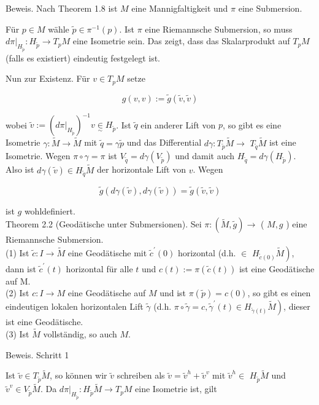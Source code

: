 \documentclass[10pt, letterpaper]{article}
\begin{document}
Beweis. Nach Theorem 1.8 ist $M$ eine Mannigfaltigkeit und $\pi$ eine Submersion.

Für $p \in M$ wähle $\tilde{p} \in \pi^{-1}(p)$. Ist $\pi$ eine Riemannsche Submersion, so muss $\left.d \pi\right|_{H_{\tilde{p}}}: H_{\tilde{p}} \rightarrow T_{p} M$ eine Isometrie sein. Das zeigt, dass das Skalarprodukt auf $T_{p} M$ (falls es existiert) eindeutig festgelegt ist.

Nun zur Existenz. Für $v \in T_{p} M$ setze

$$
g(v, v):=\tilde{g}(\tilde{v}, \tilde{v})
$$

wobei $\tilde{v}:=\left(\left.d \pi\right|_{H_{\tilde{p}}}\right)^{-1} v \underset{\sim}{\in} H_{\tilde{p}}$. Ist $\tilde{q}$ ein anderer Lift von $p$, so gibt es eine Isometrie $\gamma: \tilde{M} \rightarrow \tilde{M}$ mit $\tilde{q}=\gamma \tilde{p}$ und das Differential $d \gamma: T_{\tilde{p}} \tilde{M} \rightarrow$ $T_{\tilde{q}} \tilde{M}$ ist eine Isometrie. Wegen $\pi \circ \gamma=\pi$ ist $V_{\tilde{q}}=d \gamma\left(V_{\tilde{p}}\right)$ und damit auch $H_{\tilde{q}}=d \gamma\left(H_{\tilde{p}}\right)$. Also ist $d \gamma(\tilde{v}) \in H_{\tilde{q}} \tilde{M}$ der horizontale Lift von $v$. Wegen

$$
\tilde{g}(d \gamma(\tilde{v}), d \gamma(\tilde{v}))=\tilde{g}(\tilde{v}, \tilde{v})
$$

ist $g$ wohldefiniert.\\
Theorem 2.2 (Geodätische unter Submersionen). Sei $\pi:(\tilde{M}, \tilde{g}) \rightarrow$ ( $M, g$ ) eine Riemannsche Submersion.\\
(1) Ist $\tilde{c}: I \rightarrow \tilde{M}$ eine Geodätische mit $\tilde{c}^{\prime}(0)$ horizontal (d.h. $\in$ $\left.H_{\tilde{c}(0)} \tilde{M}\right)$, dann ist $\tilde{c}^{\prime}(t)$ horizontal für alle $t$ und $c(t):=\pi(\tilde{c}(t))$ ist eine Geodätische auf M.\\
(2) Ist $c: I \rightarrow M$ eine Geodätische auf $M$ und ist $\pi(\tilde{p})=c(0)$, so gibt es einen eindeutigen lokalen horizontalen Lift $\tilde{\gamma}$ (d.h. $\left.\pi \circ \tilde{\gamma}=c, \tilde{\gamma}^{\prime}(t) \in H_{\tilde{\gamma}(t)} \tilde{M}\right)$, dieser ist eine Geodätische.\\
(3) Ist $\tilde{M}$ vollständig, so auch $M$.

Beweis. Schritt 1

Ist $\tilde{v} \in T_{\tilde{p}} \tilde{M}$, so können wir $\tilde{v}$ schreiben als $\tilde{v}=\tilde{v}^{h}+\tilde{v}^{v}$ mit $\tilde{v}^{h} \in$ $H_{\tilde{p}} \tilde{M}$ und $\tilde{v}^{v} \in V_{\tilde{p}} \tilde{M}$. Da $\left.d \pi\right|_{H_{\tilde{p}}}: H_{\tilde{p}} \tilde{M} \rightarrow T_{p} M$ eine Isometrie ist, gilt
\end{document}
